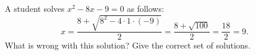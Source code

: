 A student solves $x^2-8x-9=0$ as follows:
\[
x=\dfrac{8+\sqrt{8^2-4\cdot1\cdot(-9)}}{2}=\dfrac{8+\sqrt{100}}{2}=\dfrac{18}{2}=9 .
\]
What is wrong with this solution? Give the correct set of solutions.
